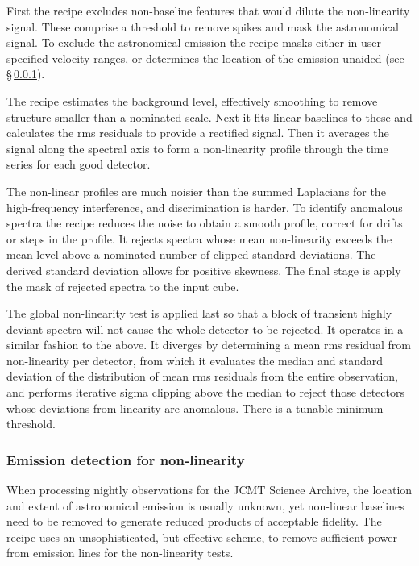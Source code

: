 \documentclass[a4paper,fleqn,usenatbib]{mnras}
\begin{document}
First the recipe excludes non-baseline features that would dilute the
non-linearity signal.  These comprise a threshold to remove spikes and
mask the astronomical signal.  To exclude the astronomical emission
the recipe masks either in user-specified velocity ranges, or
determines the location of the emission unaided (see
\S\,\ref{sec:emission_detection}).

The recipe estimates the background level, effectively smoothing to
remove structure smaller than a nominated scale.  Next it fits linear
baselines to these and calculates the rms residuals to provide a
rectified signal.  Then it averages the signal along the spectral axis
to form a non-linearity profile through the time series for each good
detector.

The non-linear profiles are much noisier than the summed Laplacians
for the high-frequency interference, and discrimination is harder.  To
identify anomalous spectra the recipe reduces the noise to obtain a
smooth profile, correct for drifts or steps in the profile.  It
rejects spectra whose mean non-linearity exceeds the mean level above
a nominated number of clipped standard deviations.  The derived
standard deviation allows for positive skewness.  The final stage
is apply the mask of rejected spectra to the input cube.

The global non-linearity test is applied last so that a block of
transient highly deviant spectra will not cause the whole detector to
be rejected.  It operates in a similar fashion to the above.  It
diverges by determining a mean rms residual from non-linearity per
detector, from which it evaluates the median and standard deviation of
the distribution of mean rms residuals from the entire observation,
and performs iterative sigma clipping above the median to reject those
detectors whose deviations from linearity are anomalous.  There is a
tunable minimum threshold.

\subsubsection{Emission detection for non-linearity}
\label{sec:emission_detection}

When processing nightly observations for the JCMT Science Archive, the
location and extent of astronomical emission is usually unknown, yet
non-linear baselines need to be removed to generate reduced products
of acceptable fidelity.  The recipe uses an unsophisticated, but
effective scheme, to remove sufficient power from emission lines for
the non-linearity tests.
\end{document}
